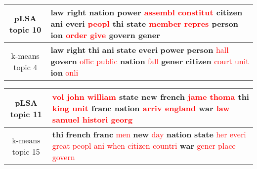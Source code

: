 \begin{center}\begin{tabularx}{\textwidth} {
  | c | >{\raggedright\arraybackslash}X | } \hline 
pLSA topic 10 & \textbf{law} \textbf{right} \textbf{nation} \textbf{power} \textcolor{red}{assembl} \textcolor{red}{constitut} \textbf{citizen} \textbf{ani} \textbf{everi} \textcolor{red}{peopl} \textbf{thi} \textbf{state} \textcolor{red}{member} \textcolor{red}{repres} \textbf{person} \textbf{ion} \textcolor{red}{order} \textcolor{red}{give} \textbf{govern} \textbf{gener} \\ \hline 
k-means topic 4 & \textbf{law} \textbf{right} \textbf{thi} \textbf{ani} \textbf{state} \textbf{everi} \textbf{power} \textbf{person} \textcolor{red}{hall} \textbf{govern} \textcolor{red}{offic} \textcolor{red}{public} \textbf{nation} \textcolor{red}{fall} \textbf{gener} \textbf{citizen} \textcolor{red}{court} \textcolor{red}{unit} \textbf{ion} \textcolor{red}{onli} \\ \hline 
\end{tabularx}

\end{center}

\begin{center}\begin{tabularx}{\textwidth} {
  | c | >{\raggedright\arraybackslash}X | } \hline 
pLSA topic 11 & \textcolor{red}{vol} \textcolor{red}{john} \textcolor{red}{william} \textbf{state} \textbf{new} \textbf{french} \textcolor{red}{jame} \textcolor{red}{thoma} \textbf{thi} \textcolor{red}{king} \textcolor{red}{unit} \textbf{franc} \textbf{nation} \textcolor{red}{arriv} \textcolor{red}{england} \textbf{war} \textcolor{red}{law} \textcolor{red}{samuel} \textcolor{red}{histori} \textcolor{red}{georg} \\ \hline 
k-means topic 15 & \textbf{thi} \textbf{french} \textbf{franc} \textcolor{red}{men} \textbf{new} \textcolor{red}{day} \textbf{nation} \textbf{state} \textcolor{red}{her} \textcolor{red}{everi} \textcolor{red}{great} \textcolor{red}{peopl} \textcolor{red}{ani} \textcolor{red}{when} \textcolor{red}{citizen} \textcolor{red}{countri} \textbf{war} \textcolor{red}{gener} \textcolor{red}{place} \textcolor{red}{govern} \\ \hline 
\end{tabularx}

\end{center}

